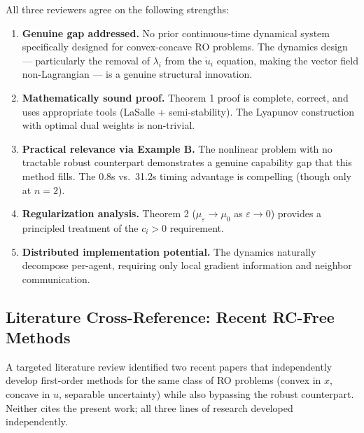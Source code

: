 \documentclass[journal,twoside,web]{ieeecolor}
\begin{document}
All three reviewers agree on the following strengths:

\begin{enumerate}
\item \textbf{Genuine gap addressed.} No prior continuous-time dynamical system specifically designed for convex-concave RO problems. The dynamics design --- particularly the removal of $\lambda_i$ from the $\dot{u}_i$ equation, making the vector field non-Lagrangian --- is a genuine structural innovation.

\item \textbf{Mathematically sound proof.} Theorem 1 proof is complete, correct, and uses appropriate tools (LaSalle + semi-stability). The Lyapunov construction with optimal dual weights is non-trivial.

\item \textbf{Practical relevance via Example B.} The nonlinear problem with no tractable robust counterpart demonstrates a genuine capability gap that this method fills. The 0.8s vs.\ 31.2s timing advantage is compelling (though only at $n=2$).

\item \textbf{Regularization analysis.} Theorem 2 ($\mu_\varepsilon \to \mu_0$ as $\varepsilon \to 0$) provides a principled treatment of the $c_i > 0$ requirement.

\item \textbf{Distributed implementation potential.} The dynamics naturally decompose per-agent, requiring only local gradient information and neighbor communication.
\end{enumerate}

\subsection*{Literature Cross-Reference: Recent RC-Free Methods}

A targeted literature review identified two recent papers that independently develop first-order methods for the same class of RO problems (convex in $x$, concave in $u$, separable uncertainty) while also bypassing the robust counterpart. Neither cites the present work; all three lines of research developed independently.
\end{document}
